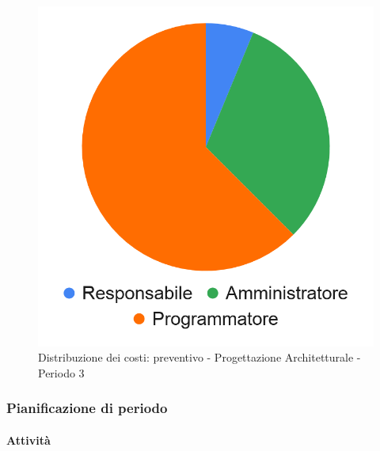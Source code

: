 \hspace{-1cm}
\begin{minipage}{.50\textwidth}
\smallPreventivoTable{
	
}
\end{minipage}
\hspace{1cm}
\begin{minipage}{.40\textwidth}
\begin{figure}[H]
	\includegraphics[scale=0.21]{res/images/charts/preventivo_priori/Grafico4-5.png}
	\caption{Distribuzione dei costi: preventivo - Progettazione Architetturale - Periodo 3}
\end{figure}
\end{minipage} 


\subsubsection{Pianificazione di periodo}



\paragraph{Attività}
\subparagraph*{}

\planningTable{
	
}



